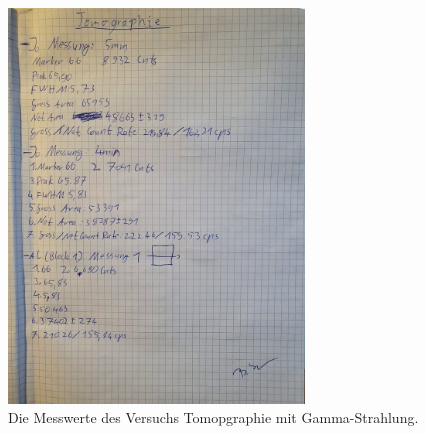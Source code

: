 \begin{figure}[h]
    \centering
    \includegraphics[width=0.7\textwidth]{latex/images/Mess1.jpeg}
    \caption{Die Messwerte des Versuchs Tomopgraphie mit Gamma-Strahlung.}
\end{figure}

